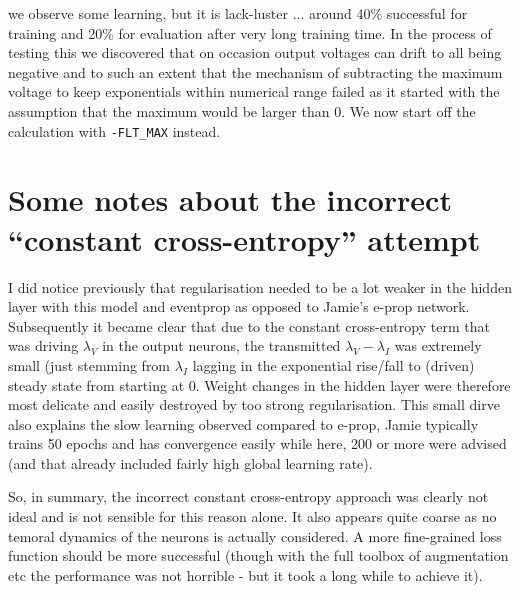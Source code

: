 \documentclass[a4paper]{article}
\begin{document}
     we observe some learning, but it is lack-luster ... around 40\% successful for training and 20\% for evaluation after very long training time. In the process of testing this we discovered that on occasion output voltages can drift to all being negative and to such an extent that the mechanism of subtracting the maximum voltage to keep exponentials within numerical range failed as it started with the assumption that the maximum would be larger than 0. We now start off the calculation with \verb+-FLT_MAX+ instead.
     
     \section{Some notes about the incorrect ``constant cross-entropy'' attempt}
     I did notice previously that regularisation needed to be a lot weaker in the hidden layer with this model and eventprop as opposed to Jamie's e-prop network. Subsequently it became clear that due to the constant cross-entropy term that was driving $\lambda_V$ in the output neurons, the transmitted $\lambda_V-\lambda_I$ was extremely small (just stemming from $\lambda_I$ lagging in the exponential rise/fall to (driven) steady state from starting at $0$. Weight changes in the hidden layer were therefore most delicate and easily destroyed by too strong regularisation. This small dirve also explains the slow learning observed compared to e-prop, Jamie typically trains 50 epochs and has convergence easily while here, 200 or more were advised (and that already included fairly high global learning rate).

     So, in summary, the incorrect constant cross-entropy approach was clearly not ideal and is not sensible for this reason alone. It also appears quite coarse as no temoral dynamics of the neurons is actually considered. A more fine-grained loss function should be more successful (though with the full toolbox of augmentation etc the performance was not horrible - but it took a long while to achieve it).
  
\end{document}
